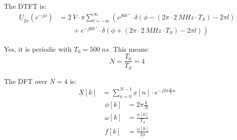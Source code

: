 \begin{solution}
\begin{tasks}
		The DTFT is:
		\begin{equation*}
			\begin{split}
				\underline{U}_{2\pi}\left(e^{-j \phi}\right) &= \SI{2}{V} \cdot \pi \sum\limits_{l = -\infty}^{\infty} \left( e^{j \SI{60}{\degree}} \cdot \delta\left(\phi - \left(2\pi \cdot \SI{2}{MHz} \cdot T_S\right) - 2\pi l\right)\right. \\ &\qquad + \left.e^{-j \SI{60}{\degree}} \cdot \delta\left(\phi + \left(2\pi \cdot \SI{2}{MHz} \cdot T_S\right) - 2\pi l\right) \right)
			\end{split}
		\end{equation*}
		
		\task
		Yes, it is periodic with $T_0=\SI{500}{ns}$. This means:
		\begin{equation*}
			N = \frac{T_0}{T_S} = 4
		\end{equation*}
		
		The DFT over $N=4$ is:
		\begin{equation*}
			\begin{split}
				\underline{X}[k] &= \sum\limits_{n=0}^{N-1} \underline{x}[n] \cdot e^{-j 2\pi \frac{k}{N} n}
			\end{split}
		\end{equation*}
		\begin{equation*}
			\begin{split}
				\phi[k] &= 2 \pi \frac{k}{N} \\
				\omega[k] &= \frac{\phi[k]}{T_S} \\
				f[k] &= \frac{\omega[k]}{2 \pi} \\
			\end{split}
		\end{equation*}
		

\end{tasks}
\end{solution}
